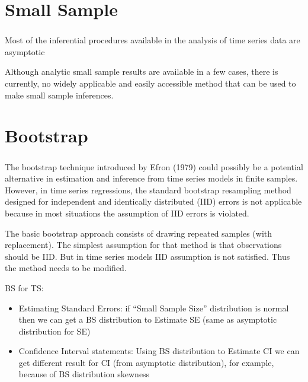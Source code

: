 \documentclass[c, dvipsnames]{beamer}  %
\begin{document}
\section{Small Sample}

\begin{frame}[shrink=5]
\frametitle{\insertsection} 


Most of the inferential procedures available in the analysis of time series data are asymptotic

Although analytic small sample results are available in a few cases, there is currently, no widely applicable and easily accessible method that can be used to make small sample inferences.

\end{frame}



\section{Bootstrap}




\begin{frame}[shrink=5]
\frametitle{\insertsection} 


The bootstrap technique introduced by Efron (1979) could possibly be a potential alternative in estimation and inference from time series models in finite samples. However, in time series regressions, the standard bootstrap resampling method designed for independent and identically distributed (IID) errors is not applicable because in most situations the assumption of IID errors is violated. 


The basic bootstrap approach consists of drawing repeated samples (with replacement). 
The simplest assumption for that method is that observations should be IID. 
But in time series models IID assumption is not satisfied.
Thus the method needs to be modified.

	\begin{block}{BS for TS:}

\begin{itemize}
	\item Estimating Standard Errors:  if “Small Sample Size” distribution is normal then we can get a BS distribution to Estimate SE (same as asymptotic distribution for SE)
	\item Confidence Interval statements:
	Using BS distribution to Estimate CI we can get  different result for CI (from asymptotic distribution), for example, because of BS distribution skewness 
\end{itemize}

\end{block}

\end{frame}
\end{document}

